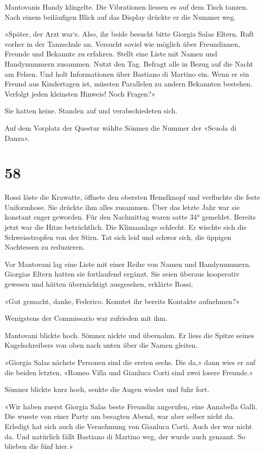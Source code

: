 Mantovanis Handy klingelte. Die Vibrationen liessen es auf dem Tisch
tanzen. Nach einem beiläufigen Blick auf das Display drückte er die
Nummer weg.

«Später, der Arzt war`s. Also, ihr beide besucht bitte Giorgia Salas
Eltern. Ruft vorher in der Tanzschule an. Versucht soviel wie möglich
über Freundinnen, Freunde und Bekannte zu erfahren. Stellt eine Liste
mit Namen und Handynummern zusammen. Nutzt den Tag. Befragt alle in
Bezug auf die Nacht am Felsen. Und holt Informationen über Bastiano di
Martino ein. Wenn er ein Freund aus Kindertagen ist, müssten Parallelen
zu andern Bekannten bestehen. Verfolgt jeden kleinsten Hinweis! Noch
Fragen?»

Sie hatten keine. Standen auf und verabschiedeten sich.

Auf dem Vorplatz der Questur wählte Sönmez die Nummer der «Scuola di
Danza».

\chapter{58}\label{section-58}

Rossi löste die Krawatte, öffnete den obersten Hemdknopf und verfluchte
die feste Uniformhose. Sie drückte ihm alles zusammen. Über das letzte
Jahr war sie konstant enger geworden. Für den Nachmittag waren satte 34°
gemeldet. Bereits jetzt war die Hitze beträchtlich. Die Klimaanlage
schlecht. Er wischte sich die Schweisstropfen von der Stirn. Tat sich
leid und schwor sich, die üppigen Nachtessen zu reduzieren.

Vor Mantovani lag eine Liste mit einer Reihe von Namen und Handynummern.
Giorgias Eltern hatten sie fortlaufend ergänzt. Sie seien überaus
kooperativ gewesen und hätten übernächtigt ausgesehen, erklärte Rossi.

«Gut gemacht, danke, Federico. Konntet ihr bereits Kontakte aufnehmen?»

Wenigstens der Commissario war zufrieden mit ihm.

Mantovani blickte hoch. Sömnez nickte und übernahm. Er liess die Spitze
seines Kugelschreibers von oben nach unten über die Namen gleiten.

«Giorgia Salas nächste Personen sind die ersten sechs. Die da,» dann
wies er auf die beiden letzten, «Romeo Villa und Gianluca Corti sind
zwei losere Freunde.»

Sömnez blickte kurz hoch, senkte die Augen wieder und fuhr fort.

«Wir haben zuerst Giorgia Salas beste Freundin angerufen, eine Annabella
Galli. Die wusste von einer Party am besagten Abend, war aber selber
nicht da. Erledigt hat sich auch die Vernehmung von Gianluca Corti. Auch
der war nicht da. Und natürlich fällt Bastiano di Martino weg, der wurde
auch genannt. So blieben die fünf hier.»

